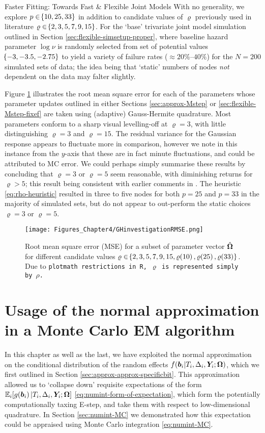 \begin{chapter}{\label{cha:flexible}Faster Fitting: Towards Fast \& Flexible Joint Models}
With no generality, we explore $p\in\!\left\{10,25,33\right\}$ in addition to candidate values of $\varrho$ previously used in literature $\varrho\in\!\left\{2,3,5,7,9,15\right\}$. For the `base' trivariate joint model simulation outlined in Section \ref{sec:flexible-simsetup-proper}, where baseline hazard parameter $\log\nu$ is randomly selected from set of potential values $\!\left\{-3,-3.5,-2.75\right\}$ to yield a variety of failure rates ($\approx20\%$--$40\%$) for the $N=200$ simulated sets of data; the idea being that `static' numbers of nodes \textit{not} dependent on the data may falter slightly. 

Figure \ref{fig:flexbile-quadrature} illustrates the root mean square error for each of the parameters whose parameter updates outlined in either Sections \ref{sec:approx-Mstep} or \ref{sec:flexible-Mstep-fixef} are taken using (adaptive) Gauss-Hermite quadrature. Most parameters conform to a sharp visual levelling-off at $\varrho=3$, with little distinguishing $\varrho=3$ and $\varrho=15$. The residual variance for the Gaussian response appears to fluctuate more in comparison, however we note in this instance from the $y$-axis that these are in fact minute fluctuations, and could be attributed to MC error. We could perhaps simply summarise these results by concluding that $\varrho=3$ or $\varrho=5$ seem reasonable, with diminishing returns for $\varrho>5$; this result being consistent with earlier comments in \citet{Rizopoulos2012}. The heuristic \eqref{eq:rho-heuristic} resulted in three to five nodes for both $p=25$ and $p=33$ in the majority of simulated sets, but do not appear to out-perform the static choices $\varrho=3$ or $\varrho=5$.

\begin{figure}
    \centering
    \texttt{[image: Figures\_Chapter4/GHinvestigationRMSE.png]}
    \caption{Root mean square error (MSE) for a subset of parameter vector $\hat{\bm{\Omega}}$ for different candidate values $\varrho\in\!\left\{2,3,5,7,9,15,\varrho\!\left(10\right),\varrho\!\left(25\right),\varrho\!\left(33\right)\right\}$. Due to \tt{plotmath} restrictions in \tt{R}, $\varrho$ is represented simply by $\rho$.}
    \label{fig:flexbile-quadrature}
\end{figure}

\section{Usage of the normal approximation in a Monte Carlo EM algorithm}\label{sec:flexible-mc-em}

In this chapter as well as the last, we have exploited the normal approximation on the conditional distribution of the random effects $f\!\left(\bm{b}_i|T_i, \Delta_i, \bm{Y}_i; \bm{\mathrm{\Omega}}\right)$, which we first outlined in Section \ref{sec:approx-approx-specificbit}. This approximation allowed us to `collapse down' requisite expectations of the form $\mathbb{E}_i\!\left[ g\!\left(\bm{b}_i\right)|T_i,\Delta_i,\bm{Y}_i;\bm{\mathrm{\Omega}}\right]$ \eqref{eq:numint-form-of-expectation}, which form the potentially computationally taxing E-step, and take them with respect to low-dimensional quadrature. In Section \ref{sec:numint-MC} we demonstrated how this expectation could be appraised using Monte Carlo integration \eqref{eq:numint-MC}.


\end{chapter}
